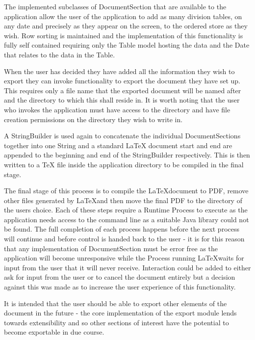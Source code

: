 The implemented subclasses of DocumentSection that are available to
the application allow the user of the application to add as many
division tables, on any date and precisely as they appear on the
screen, to the ordered store as they wish. Row sorting is maintained
and the implementation of this functionality is fully self contained
requiring only the Table model hosting the data and the Date that
relates to the data in the Table.

When the user has decided they have added all the information they
wish to export they can invoke functionality to export the document
they have set up. This requires only a file name that the exported
document will be named after and the directory to which this shall
reside in. It is worth noting that the user who invokes the
application must have access to the directory and have file creation
permissions on the directory they wish to write in.

A StringBuilder is used again to concatenate the individual
DocumentSections together into one String and a standard \LaTeX
document start and end are appended to the beginning and end of the
StringBuilder respectively. This is then written to a TeX file inside
the application directory to be compiled in the final stage.

The final stage of this process is to compile the \LaTeX document to
PDF, remove other files generated by \LaTeX and then move the final
PDF to the directory of the users choice. Each of these steps require
a Runtime Process to execute as the application needs access to the
command line as a suitable Java library could not be found. The full
completion of each process happens before the next process will
continue and before control is handed back to the user - it is for
this reason that any implementation of DocumentSection must be error
free as the application will become unresponsive while the Process
running \LaTeX waits for input from the user that it will never
receive. Interaction could be added to either ask for input from the
user or to cancel the document entirely but a decision against this
was made as to increase the user experience of this functionality.

It is intended that the user should be able to export other elements
of the document in the future - the core implementation of the export
module lends towards extensibility and so other sections of interest
have the potential to become exportable in due course.
